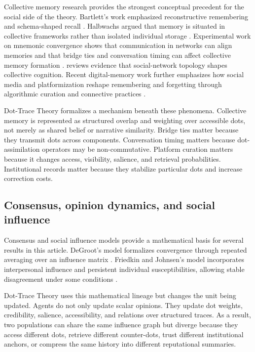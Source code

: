 \documentclass[11pt]{article}
\theoremstyle{remark}
\begin{document}
Collective memory research provides the strongest conceptual precedent for the social side of the theory. Bartlett's work emphasized reconstructive remembering and schema-shaped recall \citep{bartlett1932remembering}. Halbwachs argued that memory is situated in collective frameworks rather than isolated individual storage \citep{halbwachs1992collective}. Experimental work on mnemonic convergence shows that communication in networks can align memories and that bridge ties and conversation timing can affect collective memory formation \citep{coman2016mnemonic,momennejad2019bridge}. \citet{momennejad2022collective} reviews evidence that social-network topology shapes collective cognition. Recent digital-memory work further emphasizes how social media and platformization reshape remembering and forgetting through algorithmic curation and connective practices \citep{adriaansen2025collective}.

Dot-Trace Theory formalizes a mechanism beneath these phenomena. Collective memory is represented as structured overlap and weighting over accessible dots, not merely as shared belief or narrative similarity. Bridge ties matter because they transmit dots across components. Conversation timing matters because dot-assimilation operators may be non-commutative. Platform curation matters because it changes access, visibility, salience, and retrieval probabilities. Institutional records matter because they stabilize particular dots and increase correction costs.

\subsection{Consensus, opinion dynamics, and social influence}\label{consensus-opinion-dynamics-social-influence}

Consensus and social influence models provide a mathematical basis for several results in this article. DeGroot's model formalizes convergence through repeated averaging over an influence matrix \citep{degroot1974reaching}. Friedkin and Johnsen's model incorporates interpersonal influence and persistent individual susceptibilities, allowing stable disagreement under some conditions \citep{friedkin1990social}.

Dot-Trace Theory uses this mathematical lineage but changes the unit being updated. Agents do not only update scalar opinions. They update dot weights, credibility, salience, accessibility, and relations over structured traces. As a result, two populations can share the same influence graph but diverge because they access different dots, retrieve different counter-dots, trust different institutional anchors, or compress the same history into different reputational summaries.
\end{document}
